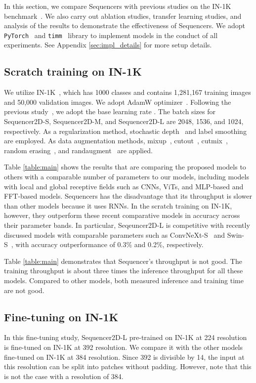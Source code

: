 \documentclass{article}
\begin{document}
In this section, we compare Sequencers with previous studies on the IN-1K benchmark~\cite{krizhevsky2012imagenet}. We also carry out ablation studies, transfer learning studies, and analysis of the results to demonstrate the effectiveness of Sequencers. We adopt \texttt{PyTorch}~\cite{paszke2019pytorch} and \texttt{timm}~\cite{rw2019timm} library to implement models in the conduct of all experiments. See Appendix \ref{sec:impl_details} for more setup details.

\subsection{Scratch training on IN-1K}
\label{subsec:in1k}
We utilize IN-1K~\cite{krizhevsky2012imagenet}, which has 1000 classes and contains 1,281,167 training images and 50,000 validation images. We adopt AdamW optimizer~\cite{loshchilov2017decoupled}. Following the previous study~\cite{touvron2020training}, we adopt the base learning rate .  The batch sizes for Sequencer2D-S, Sequencer2D-M, and Sequencer2D-L are 2048, 1536, and 1024, respectively. As a regularization method, stochastic depth~\cite{huang2016deep} and label smoothing~\cite{szegedy2016rethinking} are employed. As data augmentation methods, mixup~\cite{zhang2017mixup}, cutout~\cite{devries2017improved}, cutmix~\cite{yun2019cutmix}, random erasing~\cite{zhong2020random}, and randaugment~\cite{cubuk2020randaugment} are applied. 

Table \ref{table:main} shows the results that are comparing the proposed models to others with a comparable number of parameters to our models, including models with local and global receptive fields such as CNNs, ViTs, and MLP-based and FFT-based models. Sequencers has the disadvantage that its throughput is slower than other models because it uses RNNs. In the scratch training on IN-1K, however, they outperform these recent comparative models in accuracy across their parameter bands. In particular, Seqeuncer2D-L is competitive with recently discussed models with comparable parameters such as ConvNeXt-S~\cite{liu2022convnet} and Swin-S~\cite{liu2021swin}, with accuracy outperformance of 0.3\% and 0.2\%, respectively.

Table \ref{table:main} demonstrates that Sequencer’s throughput is not good. The training throughput is about three times the inference throughput for all these models. Compared to other models, both measured inference and training time are not good.

\subsection{Fine-tuning on IN-1K}
\label{subsec:ft_in1k}
In this fine-tuning study, Sequencer2D-L pre-trained on IN-1K at 224 resolution is fine-tuned on IN-1K at 392 resolution. We compare it with the other models fine-tuned on IN-1K at 384 resolution. Since 392 is divisible by 14, the input at this resolution can be split into patches without padding. However, note that this is not the case with a resolution of 384.
\end{document}
